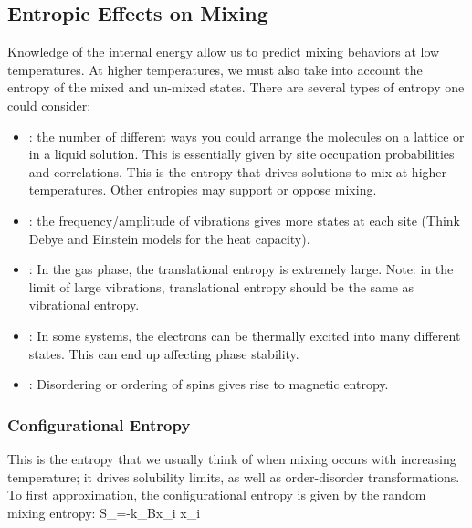 \documentclass[12pt]{article}
\begin{document}
\subsection{Entropic Effects on Mixing}
Knowledge of the internal energy allow us to predict mixing behaviors at low temperatures. At higher temperatures, we must also take into account the entropy of the mixed and un-mixed states. There are several types of entropy one could consider:
\begin{itemize}
\item {}: the number of different ways you could arrange the molecules on a lattice or in a liquid solution. This is essentially given by site occupation probabilities and correlations. This is the entropy that drives solutions to mix at higher temperatures. Other entropies may support or oppose mixing.
\item {}: the frequency/amplitude of vibrations gives more states at each site (Think Debye and Einstein models for the heat capacity).
\item {}: In the gas phase, the translational entropy is extremely large. Note: in the limit of large vibrations, translational entropy should be the same as vibrational entropy.
\item {}: In some systems, the electrons can be thermally excited into many different states. This can end up affecting phase stability.
\item {}: Disordering or ordering of spins gives rise to magnetic entropy.
\end{itemize} 

\subsubsection{Configurational Entropy}
This is the entropy that we usually think of when mixing occurs with increasing temperature; it drives solubility limits, as well as order-disorder transformations. To first approximation, the configurational entropy is given by the random mixing entropy:
\eqs S_{}=-k_B\sum x_i \ln x_i \eqe
\end{document}
